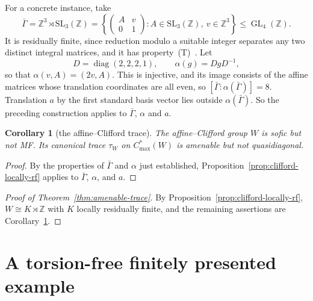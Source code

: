 \documentclass[11pt]{amsart}
\newcommand{\leanverified}[2]{\ignorespaces}
\newtheorem{corollary}[theorem]{Corollary}
\theoremstyle{plain}
\newcommand{\GL}{\operatorname{GL}}
\begin{document}
For a concrete instance, take
\[
 \bar\Gamma=\mathbb Z^3\rtimes\mathrm{SL}_3(\mathbb Z)
 =\left\{
   \begin{pmatrix}A&v\\0&1\end{pmatrix}:
   A\in\mathrm{SL}_3(\mathbb Z),\ v\in\mathbb Z^3
  \right\}
 \le\GL_4(\mathbb Z).
\]
It is residually finite, since reduction modulo a suitable integer
separates any two distinct integral matrices, and it has
property~\textup{(T)}~\cite[Example~1.7.4(i)]{BHV}.
\leanverified{Sofic/CommutingLampCollapse}{GroupApproximation.CommutingLampCollapse.gammaBar_hasKazhdanPropertyT}
\leanverified{Monsters/ExplicitIntegralLinearModel}{GroupApproximation.ExplicitIntegralLinearModel.gammaBar_residuallyFinite}
Let
\[
 D=\operatorname{diag}(2,2,2,1),\qquad
 \alpha(g)=DgD^{-1},
\]
so that $\alpha(v,A)=(2v,A)$.  This is injective, and its image consists
of the affine matrices whose translation coordinates are all even, so
$[\bar\Gamma:\alpha(\bar\Gamma)]=8$.  Translation $a$ by the first
standard basis vector lies outside $\alpha(\bar\Gamma)$.  So the preceding
construction applies to $\bar\Gamma$, $\alpha$ and $a$.

\begin{corollary}[the affine--Clifford trace]
\label{cor:affine-clifford-trace}
The affine--Clifford group $W$ is sofic but not MF.  Its canonical trace
$\tau_W$ on $C^*_{\max}(W)$ is amenable but not
quasidiagonal.
\end{corollary}

\begin{proof}
By the properties of $\bar\Gamma$ and $\alpha$ just established,
Proposition~\ref{prop:clifford-locally-rf} applies to $\bar\Gamma$,
$\alpha$, and $a$.
\leanverified{Sofic/CliffordWitnessLocallyRFByInt}{GroupApproximation.CliffordWitnessLocallyRFByInt.witnessCanonicalMaximalTrace_isAmenableTrace}
\leanverified{Manuscript/NinetyNineProblems/ProblemXCliffordWitness}{GroupApproximation.NinetyNineProblems.witnessCanonicalTrace_amenable_not_quasidiagonal}
\end{proof}

\begin{proof}[Proof of Theorem~\ref{thm:amenable-trace}]
By Proposition~\ref{prop:clifford-locally-rf}, $W\cong K\rtimes\mathbb Z$
with $K$ locally residually finite, and the remaining assertions are
Corollary~\ref{cor:affine-clifford-trace}.
\end{proof}

\section{A torsion-free finitely presented example}
\label{sec:torsion-free}
\end{document}
